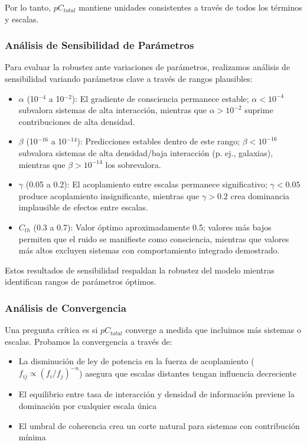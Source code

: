 \documentclass[12pt]{article}
\begin{document}
Por lo tanto, $pC_{total}$ mantiene unidades consistentes a través de todos los términos y escalas.

\subsubsection{Análisis de Sensibilidad de Parámetros}

Para evaluar la robustez ante variaciones de parámetros, realizamos análisis de sensibilidad variando parámetros clave a través de rangos plausibles:

\begin{itemize}
    \item $\alpha$ (10$^{-4}$ a 10$^{-2}$): El gradiente de consciencia permanece estable; $\alpha < 10^{-4}$ subvalora sistemas de alta interacción, mientras que $\alpha > 10^{-2}$ suprime contribuciones de alta densidad.
    
    \item $\beta$ (10$^{-16}$ a 10$^{-14}$): Predicciones estables dentro de este rango; $\beta < 10^{-16}$ subvalora sistemas de alta densidad/baja interacción (p. ej., galaxias), mientras que $\beta > 10^{-14}$ los sobrevalora.
    
    \item $\gamma$ (0.05 a 0.2): El acoplamiento entre escalas permanece significativo; $\gamma < 0.05$ produce acoplamiento insignificante, mientras que $\gamma > 0.2$ crea dominancia implausible de efectos entre escalas.
    
    \item $C_{th}$ (0.3 a 0.7): Valor óptimo aproximadamente 0.5; valores más bajos permiten que el ruido se manifieste como consciencia, mientras que valores más altos excluyen sistemas con comportamiento integrado demostrado.
\end{itemize}

Estos resultados de sensibilidad respaldan la robustez del modelo mientras identifican rangos de parámetros óptimos.

\subsubsection{Análisis de Convergencia}

Una pregunta crítica es si $pC_{total}$ converge a medida que incluimos más sistemas o escalas. Probamos la convergencia a través de:

\begin{itemize}
    \item La disminución de ley de potencia en la fuerza de acoplamiento ($f_{ij} \propto (f_i/f_j)^{-n}$) asegura que escalas distantes tengan influencia decreciente
    
    \item El equilibrio entre tasa de interacción y densidad de información previene la dominación por cualquier escala única
    
    \item El umbral de coherencia crea un corte natural para sistemas con contribución mínima
\end{itemize}
\end{document}
